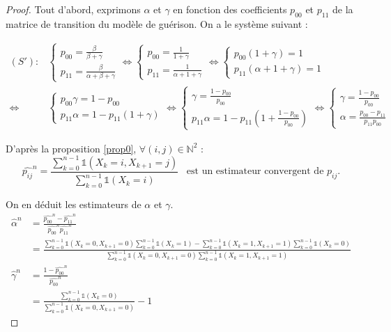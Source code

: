 \documentclass[12pt,a4paper]{report}
\theoremstyle{remark}
\begin{document}
\begin{proof}
Tout d'abord, exprimons $\alpha$ et $\gamma$ en fonction des coefficients $p_{00}$ et $p_{11}$ de la matrice de transition du modèle de guérison.
On a le système suivant :

\begin{align*}
(S') : &\left\{
\begin{array}{ll}
        p_{00} = \frac{\beta}{\beta+\gamma} \\
        p_{11} = \frac{\beta}{\alpha+\beta+\gamma} 
    \end{array}
\right.
\iff\left\{
\begin{array}{ll}
          p_{00} = \frac{1}{1+\gamma} \\
        p_{11} = \frac{1}{\alpha+1+\gamma}
    \end{array}
\right.
\iff \left\{
\begin{array}{ll}
         p_{00}(1+\gamma)= 1 \\
        p_{11}(\alpha + 1 +\gamma) =1  \end{array}
\right.\\
\iff &\left\{
\begin{array}{ll}
          p_{00}\gamma= 1-p_{00} \\
        p_{11}\alpha = 1 - p_{11}(1+\gamma)   \end{array}
    \right.
\iff \left\{
\begin{array}{ll}
        \gamma= \frac{1-p_{00}}{p_{00}} \\
       p_{11}\alpha = 1 - p_{11}(1+\frac{1-p_{00}}{p_{00}})  
       \end{array}  
    \right.   
\iff \left\{
\begin{array}{ll}
         \gamma= \frac{1-p_{00}}{p_{00}} \\
        \alpha = \frac{p_{00}-p_{11}}{p_{11}p_{00}}   
    \end{array}    
    \right.      
\end{align*}

D'après la proposition \ref{prop0}, $\forall (i,j) \in \mathbb{N}^2$ : $$\hat{p_{ij}}^n = \frac{\sum\limits_{k=0}^{n-1} \mathds{1}(X_k=i, X_{k+1}=j)}{\sum\limits_{k=0}^{n-1} \mathds{1}(X_k=i)} \, \, \, \text{ est un estimateur convergent de } p_{ij}.$$

On en déduit les estimateurs de $\alpha$ et $\gamma$.
\begin{align*}
\hat{\alpha}^n &= \frac{\hat{p_{00}}^n-\hat{p_{11}}^n}{\hat{p_{00}}^n\hat{p_{11}}^n} \\
&= \frac{\sum\limits_{k=0}^{n-1} \mathds{1}(X_k=0, X_{k+1}=0)\sum\limits_{k=0}^{n-1} \mathds{1}(X_k=1)-\sum\limits_{k=0}^{n-1} \mathds{1}(X_k=1, X_{k+1}=1)\sum\limits_{k=0}^{n-1} \mathds{1}(X_k=0)}{\sum\limits_{k=0}^{n-1} \mathds{1}(X_k=0, X_{k+1}=0)\sum\limits_{k=0}^{n-1} \mathds{1}(X_k=1, X_{k+1}=1)}\\
\hat{\gamma}^n &= \frac{1- \hat{p_{00}}^n}{\hat{p_{00}}^n} \\
&= \frac{{\sum\limits_{k=0}^{n-1} \mathds{1}(X_k=0)}}{{\sum\limits_{k=0}^{n-1} \mathds{1}(X_k=0,X_{k+1}=0)}} - 1
\end{align*}
\end{proof}
\end{document}
